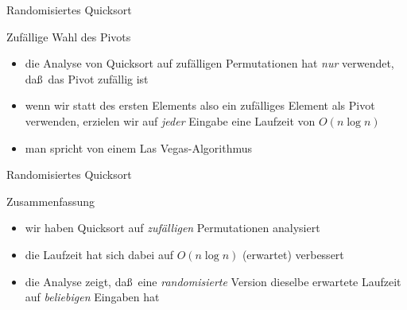 \documentclass[aspectratio=1610, 11pt]{beamer}
\begin{document}
\begin{frame}{Randomisiertes Quicksort}
	\begin{exampleblock}{Zuf\"allige Wahl des Pivots}
		\begin{itemize}
			\item die Analyse von Quicksort auf zuf\"alligen Permutationen hat \emph{nur} verwendet, da\ss\ das Pivot zuf\"allig ist
			\item wenn wir statt des ersten Elements also ein \alert{zuf\"alliges} Element als Pivot verwenden, erzielen wir auf \emph{jeder} Eingabe eine Laufzeit von $O(n\log n)$
			\item man spricht von einem \alert{Las Vegas-Algorithmus}
		\end{itemize}
	\end{exampleblock}
\end{frame}

\begin{frame}{Randomisiertes Quicksort}
\begin{exampleblock}{Zusammenfassung}
	\begin{itemize}
		\item wir haben Quicksort auf \emph{zuf\"alligen} Permutationen analysiert
		\item die Laufzeit hat sich dabei auf $O(n\log n)$ (erwartet) verbessert
		\item die Analyse zeigt, da\ss\ eine \emph{randomisierte} Version dieselbe erwartete Laufzeit auf \emph{beliebigen} Eingaben hat
	\end{itemize}
	\end{exampleblock}
\end{frame}
\end{document}
